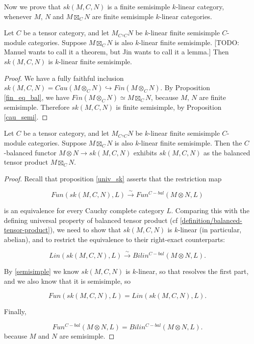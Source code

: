 Now we prove that $sk(M,C,N)$ is a finite semisimple $k$-linear category,
whenever $M$, $N$ and $M\boxtimes_C N$ are finite semisimple $k$-linear
categories.

\begin{lemma}\label{semisimple}
  Let $C$ be a tensor category, and let $M_C$,$_{C}N$ be $k$-linear finite
  semisimple $C$-module categories. Suppose $M\boxtimes_C N$ is also
  $k$-linear finite semisimple. [TODO: Manuel wants to call it a theorem, but
  Jin wants to call it a lemma.] Then $sk(M,C,N)$ is $k$-linear finite
  semisimple.
\end{lemma}%

\begin{proof}
  We have a fully faithful inclusion $sk(M,C,N)=Cau(M\otimes_C
  N)\hookrightarrow Fin(M\otimes_C N)$. By Proposition \ref{fin_eq_bal}, we
  have $Fin(M\otimes_C N)\simeq M\boxtimes_C N$, because $M$, $N$ are finite
  semisimple. Therefore $sk(M,C,N)$ is finite semisimple, by
  Proposition \ref{cau_semi}.
\end{proof}

\begin{lemma}\label{sk_bal}
  Let $C$ be a tensor category, and let $M_C$,$_{C}N$ be $k$-linear finite
  semisimple $C$-module categories. Suppose $M\boxtimes_C N$ is also
  $k$-linear finite semisimple. Then the $C$-balanced functor $M\otimes N\to
  sk(M,C,N)$ exhibits $sk(M,C,N)$ as the balanced tensor product $M\boxtimes_C
  N$.
\end{lemma}%

\begin{proof}
  Recall that proposition \ref{univ_sk} asserts that the restriction map

  \[
   Fun(sk(M,C,N),L) \xrightarrow{\sim} Fun^{C-bal}(M \otimes N,L)
  \]

  is an equivalence for every Cauchy complete category $L$. Comparing this
  with the defining universal property of balanced tensor product
  (cf \ref{definition/balanced-tensor-product}), we need to show that
  $sk(M,C,N)$ is $k$-linear (in particular, abelian), and to restrict the
  equivalence to their right-exact counterparts:

  \[
    Lin(sk(M,C,N),L) \xrightarrow{\sim} Bilin^{C-bal}(M \otimes N, L).
  \]

  By \ref{semisimple} we know $sk(M,C,N)$ is $k$-linear, so that resolves the
  first part, and we also know that it is semisimple, so

  \[
    Fun(sk(M,C,N), L) = Lin(sk(M,C,N), L).
  \]

  Finally,

  \[
    Fun^{C-bal}(M \otimes N, L) = Bilin^{C-bal}(M \otimes N, L).
  \] because $M$ and $N$ are semisimple.
\end{proof}

